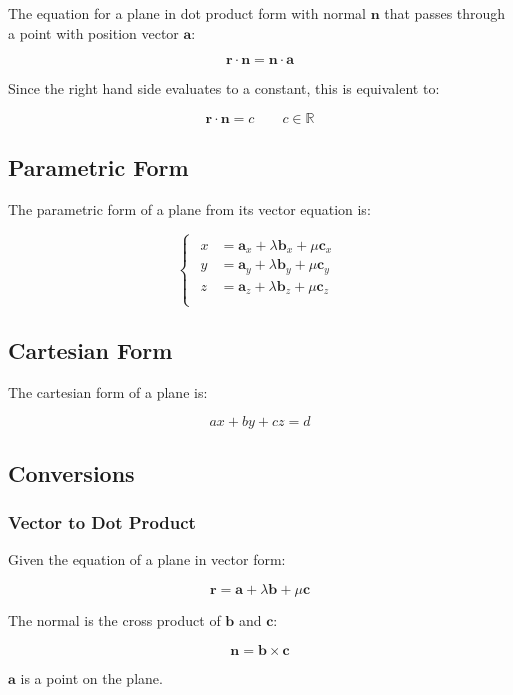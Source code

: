 \documentclass[a4paper,11pt]{article}
\newcommand{\bb}{\boldsymbol}
\begin{document}
The equation for a plane in dot product form with normal $\bb{n}$ that passes
through a point with position vector $\bb{a}$:

$$
\bb{r} \cdot \bb{n} = \bb{n} \cdot \bb{a}
$$

Since the right hand side evaluates to a constant, this is equivalent to:

$$
\bb{r} \cdot \bb{n} = c \qquad c \in \mathbb{R}
$$


\subsection{Parametric Form}

The parametric form of a plane from its vector equation is:

$$
\begin{cases}
\begin{aligned}
x & = \bb{a}_x + \lambda \bb{b}_x + \mu \bb{c}_x \\
y & = \bb{a}_y + \lambda \bb{b}_y + \mu \bb{c}_y \\
z & = \bb{a}_z + \lambda \bb{b}_z + \mu \bb{c}_z \\
\end{aligned}
\end{cases}
$$


\subsection{Cartesian Form}

The cartesian form of a plane is:

$$
ax + by + cz = d
$$


\subsection{Conversions}

\subsubsection{Vector to Dot Product}

Given the equation of a plane in vector form:

$$
\bb{r} = \bb{a} + \lambda \bb{b} + \mu \bb{c}
$$

The normal is the cross product of $\bb{b}$ and $\bb{c}$:

$$
\bb{n} = \bb{b} \times \bb{c}
$$

$\bb{a}$ is a point on the plane.
\end{document}
